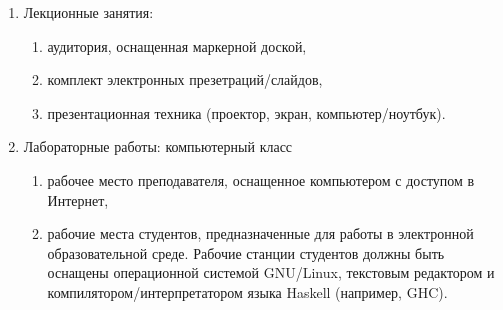 
\begin{enumerate}
\item Лекционные занятия:
\begin{enumerate}
\item аудитория, оснащенная маркерной доской, \item комплект электронных презетраций/слайдов, \item презентационная техника (проектор, экран, компьютер/ноутбук).
\end{enumerate}
\item Лабораторные работы: компьютерный класс
\begin{enumerate}
\item рабочее место преподавателя, оснащенное компьютером с доступом в Интернет, 
\item рабочие места студентов, предназначенные для работы в электронной образовательной среде. Рабочие станции студентов должны быть оснащены операционной системой GNU/Linux, текстовым редактором и компилятором/интерпретатором языка Haskell (например, GHC).
\end{enumerate}
\end{enumerate}







